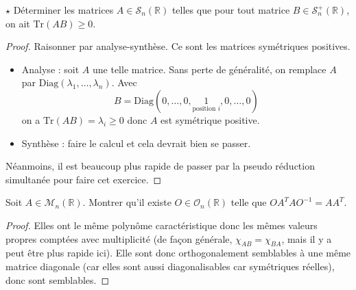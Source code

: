\documentclass[french,a4paper]{article}
\newcommand{\R}{\mathbb{R}}
\newcommand{\inv}{^{-1}}
\newcommand{\Tr}{\text{Tr}}
\theoremstyle{plain}
\theoremstyle{definition}
\theoremstyle{remark}
\begin{document}
\begin{ex}{$\star$}
	Déterminer les matrices $A\in\mathcal{S}_n(\R)$ telles que pour tout matrice $B\in\mathcal{S}_n^+(\R)$, on ait $\Tr(AB)\geqslant0$.
\end{ex}
\begin{proof}
	Raisonner par analyse-synthèse. Ce sont les matrices symétriques positives.
	\begin{itemize}
		\item Analyse : soit $A$ une telle matrice. Sans perte de généralité, on remplace $A$ par $\text{Diag}(\lambda_1,\ldots,\lambda_n)$. Avec $$B=\text{Diag}(0,\ldots,0,\underset{\text{position }i}{1},0,\ldots,0)$$ on a $\Tr(AB)=\lambda_i\geqslant 0$ donc $A$ est symétrique positive.
		\item Synthèse : faire le calcul et cela devrait bien se passer.
	\end{itemize} Néanmoins, il est beaucoup plus rapide de passer par la pseudo réduction simultanée pour faire cet exercice.
\end{proof}

\begin{ex}{}
	Soit $A\in\mathcal{M}_n(\R)$. Montrer qu'il existe $O\in\mathcal{O}_n(\R)$ telle que $OA^TAO\inv=AA^T$.
\end{ex}
\begin{proof}
	Elles ont le même polynôme caractéristique donc les mêmes valeurs propres comptées avec multiplicité (de façon générale, $\chi_{AB}=\chi_{BA}$, mais il y a peut être plus rapide ici). Elle sont donc orthogonalement semblables à une même matrice diagonale (car elles sont aussi diagonalisables car symétriques réelles), donc sont semblables.
\end{proof}
\end{document}
